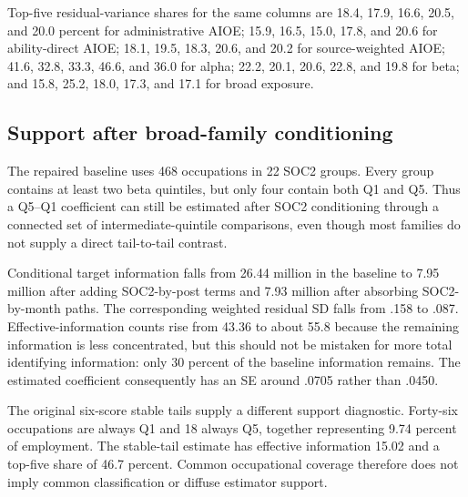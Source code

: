Top-five residual-variance shares for the same columns are 18.4, 17.9, 16.6, 20.5, and 20.0 percent for administrative AIOE; 15.9, 16.5, 15.0, 17.8, and 20.6 for ability-direct AIOE; 18.1, 19.5, 18.3, 20.6, and 20.2 for source-weighted AIOE; 41.6, 32.8, 33.3, 46.6, and 36.0 for alpha; 22.2, 20.1, 20.6, 22.8, and 19.8 for beta; and 15.8, 25.2, 18.0, 17.3, and 17.1 for broad exposure.

\subsection{Support after broad-family conditioning}

The repaired baseline uses 468 occupations in 22 SOC2 groups. Every group contains at least two beta quintiles, but only four contain both Q1 and Q5. Thus a Q5--Q1 coefficient can still be estimated after SOC2 conditioning through a connected set of intermediate-quintile comparisons, even though most families do not supply a direct tail-to-tail contrast.

Conditional target information falls from 26.44 million in the baseline to 7.95 million after adding SOC2-by-post terms and 7.93 million after absorbing SOC2-by-month paths. The corresponding weighted residual SD falls from .158 to .087. Effective-information counts rise from 43.36 to about 55.8 because the remaining information is less concentrated, but this should not be mistaken for more total identifying information: only 30 percent of the baseline information remains. The estimated coefficient consequently has an SE around .0705 rather than .0450.

The original six-score stable tails supply a different support diagnostic. Forty-six occupations are always Q1 and 18 always Q5, together representing 9.74 percent of employment. The stable-tail estimate has effective information 15.02 and a top-five share of 46.7 percent. Common occupational coverage therefore does not imply common classification or diffuse estimator support.

